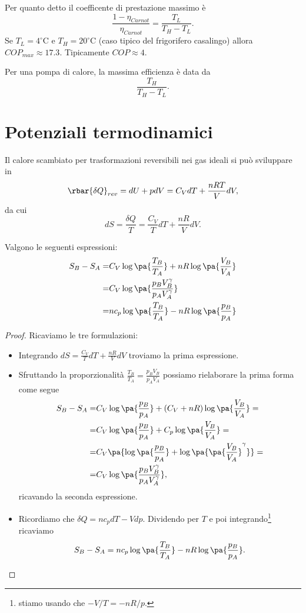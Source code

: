 \begin{remark}
Per quanto detto il coefficente di prestazione massimo \`e
\[\frac{1-\eta_{Carnot}}{\eta_{Carnot}}= \frac{T_L}{T_H-T_L}.\]
Se $T_L=4^\circ\mathrm{C}$ e $T_H=20^\circ\mathrm{C}$ (caso tipico del frigorifero casalingo) allora $COP_{max}\approx 17.3$. Tipicamente $COP\approx 4$.
\end{remark}
\begin{remark}
Per una pompa di calore, la massima efficienza \`e data da
\[\frac{T_H}{T_H-T_L}.\]
\end{remark}


\section{Potenziali termodinamici}
Il calore scambiato per trasformazioni reversibili nei gas ideali si pu\`o sviluppare in
\[\rbar{\delta Q}_{rev}=dU+pdV=C_VdT+\frac{nRT}VdV,\]
da cui
\[dS=\frac{\delta Q}T=\frac{C_V}TdT+\frac{nR}VdV.\]
\begin{proposition}\label{EntropiaGasIdeali}
Valgono le seguenti espressioni:
\begin{align*}
S_B-S_A=&C_V\log\pa{\frac{T_B}{T_A}}+nR\log\pa{\frac{V_B}{V_A}}\\
=&C_V\log\pa{\frac{p_BV_B^\gamma}{p_AV_A^\gamma}}\\
=&nc_p\log\pa{\frac{T_B}{T_A}}-nR\log\pa{\frac{p_B}{p_A}}
\end{align*}
\end{proposition}
\begin{proof}
Ricaviamo le tre formulazioni:
\begin{itemize}
\item Integrando $dS=\frac{C_V}TdT+\frac{nR}VdV$ troviamo la prima espressione.
\item Sfruttando la proporzionalit\`a $\displaystyle \frac{T_B}{T_A}=\frac{p_BV_B}{p_AV_A}$ possiamo rielaborare la prima forma come segue
\begin{align*}
S_B-S_A=&C_V\log\pa{\frac{p_B}{p_A}}+(C_V+nR)\log\pa{\frac{V_B}{V_A}}=\\
=&C_V\log\pa{\frac{p_B}{p_A}}+C_p\log\pa{\frac{V_B}{V_A}}=\\
=&C_V\pa{\log\pa{\frac{p_B}{p_A}}+\log\pa{\pa{\frac{V_B}{V_A}}^\gamma}}=\\
=&C_V\log\pa{\frac{p_BV_B^\gamma}{p_AV_A^\gamma}},
\end{align*}
ricavando la seconda espressione.
\item Ricordiamo che $\delta Q=nc_p dT-Vdp$. Dividendo per $T$ e poi integrando\footnote{stiamo usando che $-V/T=-nR/p$.} ricaviamo
\[S_B-S_A=nc_p\log\pa{\frac{T_B}{T_A}}-nR\log\pa{\frac{p_B}{p_A}}.\]
\end{itemize}
\end{proof}


